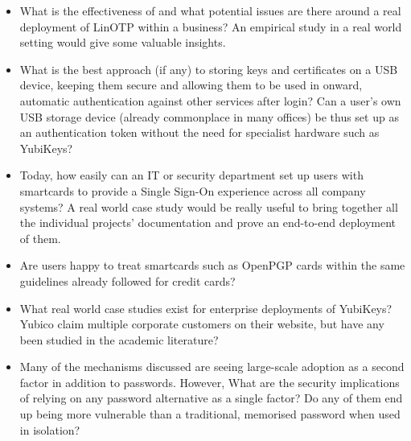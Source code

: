 \documentclass{report}
\begin{document}
\begin{itemize}
\item What is the effectiveness of and what potential issues are there around
  a real deployment of LinOTP within a business? An empirical study in a
  real world setting would give some valuable insights.
\item What is the best approach (if any) to storing keys and certificates on
  a USB device, keeping them secure and allowing them to be used in onward,
  automatic authentication against other services after login? Can a user's
  own USB storage device (already commonplace in many offices) be thus set
  up as an authentication token without the need for specialist hardware
  such as YubiKeys?
\item Today, how easily can an IT or security department set up users with
  smartcards to provide a Single Sign-On experience across all company
  systems? A real world case study would be really useful to bring together
  all the individual projects' documentation and prove an end-to-end deployment
  of them.
\item Are users happy to treat smartcards such as OpenPGP cards within the
  same guidelines already followed for credit cards?
  \item What real world case studies exist for enterprise deployments of YubiKeys?
    Yubico claim multiple corporate customers on their website, but have any
    been studied in the academic literature?
\item Many of the mechanisms discussed are seeing large-scale
  adoption as a second factor in addition to passwords. However, What are the
  security implications of relying on any password alternative as a single factor?
  Do any of them end up being more vulnerable than a traditional, memorised
  password when used in isolation?
\end{itemize}

\printbibliography
\end{document}
